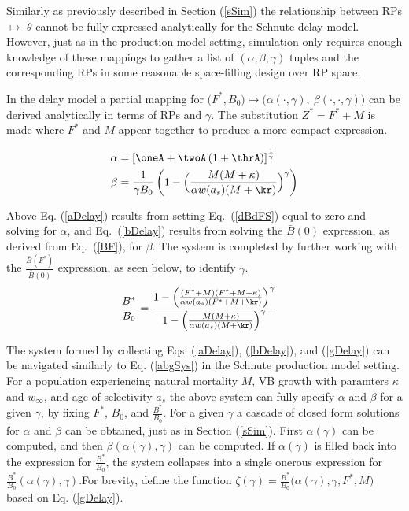 %
Similarly as previously described in Section (\ref{sSim}) the relationship 
between RPs $\mapsto$ $\theta$ cannot be fully expressed analytically for the 
Schnute delay model. However, just as in the production model setting, 
simulation only requires enough knowledge of these mappings to gather a list
of $(\alpha, \beta, \gamma)$ tuples and the corresponding RPs in some reasonable 
space-filling design over RP space. %

In the delay model a partial mapping for
$\big(F^*, B_0\big) \mapsto \big(\alpha(\cdot, \gamma), ~\beta(\cdot, \cdot, \gamma)\big)$
can be derived analytically in terms of RPs and $\gamma$. The substitution 
$Z^*=F^*+M$ is made where $F^*$ and $M$ appear together to produce a more 
compact expression.

%
\begingroup
\scriptsize
\begin{align}
\alpha & = \left[ \oneA + \twoA \left( 1 + \thrA \right) \right]^{\frac{1}{\gamma}} \label{aDelay}\\
\beta &= \frac{1}{\gamma B_0} \left( 1 - \Big(\frac{M (M + \kappa)}{\alpha w(a_s)(M + \kr)}\Big)^\gamma\right) \label{bDelay}%
\end{align}
\endgroup

%
Above Eq. (\ref{aDelay}) results from setting \mbox{Eq. (\ref{dBdFS})} equal to zero 
and solving for $\alpha$, and \mbox{Eq. (\ref{bDelay})} results from solving the 
$\bar{B}(0)$ expression, as derived from \mbox{Eq. (\ref{BF}),} for $\beta$. The system 
is completed by further working with the $\frac{\bar{B}(F^*)}{\bar{B}(0)}$ expression, 
as seen below, to identify $\gamma$.
\begin{align}
\frac{B^*}{B_0} &= \frac{ 1 - \Big(\frac{(F^* + M) (F^* + M + \kappa)}{\alpha w(a_s)(F^* + M + \kr)}\Big)^\gamma }{ 1 - \Big(\frac{M (M + \kappa)}{\alpha w(a_s)(M + \kr)}\Big)^\gamma }
\label{gDelay}
\end{align}

%
The system formed by collecting Eqs. (\ref{aDelay}), (\ref{bDelay}), and 
(\ref{gDelay}) can be navigated similarly to Eq. (\ref{abgSys}) in the Schnute 
production model setting. For a population experiencing natural mortality $M$, 
VB growth with paramters $\kappa$ and $w_\infty$, and age of selectivity $a_s$ 
the above system can fully specify $\alpha$ and $\beta$ for a given $\gamma$, 
by fixing $F^*$, $B_0$, and $\frac{B^*}{B_0}$. For a given $\gamma$ a cascade 
of closed form solutions for $\alpha$ and $\beta$ can be obtained, just as in 
Section (\ref{sSim}). 
%
First $\alpha(\gamma)$ can be computed, and then $\beta(\alpha(\gamma), \gamma)$ 
can be computed. If $\alpha(\gamma)$ is filled back into the expression for 
$\frac{B^*}{B_0}$, the system collapses into a single onerous expression for 
$\frac{B^*}{B_0}(\alpha(\gamma), \gamma)$.For brevity, define the function 
\mbox{$\zeta(\gamma)=\frac{B^*}{B_0}\big(\alpha(\gamma), \gamma, F^*, M\big)$} 
based on Eq. (\ref{gDelay}).

